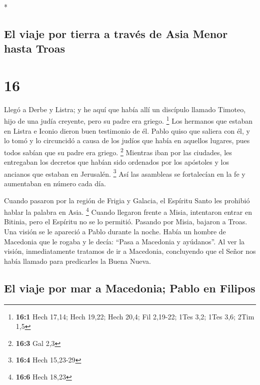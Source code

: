 \begin{paracol}{2}
\switchcolumn[0]*

\hypertarget{el-viaje-por-tierra-a-travuxe9s-de-asia-menor-hasta-troas}{%
\subsection{El viaje por tierra a través de Asia Menor hasta
Troas}\label{el-viaje-por-tierra-a-travuxe9s-de-asia-menor-hasta-troas}}

\hypertarget{section-30}{%
\section{16}\label{section-30}}

 Llegó a Derbe y Listra; y he aquí que había allí un
discípulo llamado Timoteo, hijo de una judía creyente, pero su padre era
griego. \footnote{\textbf{16:1} Hech 17,14; Hech 19,22; Hech 20,4; Fil
  2,19-22; 1Tes 3,2; 1Tes 3,6; 2Tim 1,5}  Los hermanos que
estaban en Listra e Iconio dieron buen testimonio de él. 
Pablo quiso que saliera con él, y lo tomó y lo circuncidó a causa de los
judíos que había en aquellos lugares, pues todos sabían que su padre era
griego. \footnote{\textbf{16:3} Gal 2,3}  Mientras iban
por las ciudades, les entregaban los decretos que habían sido ordenados
por los apóstoles y los ancianos que estaban en Jerusalén. \footnote{\textbf{16:4}
  Hech 15,23-29}  Así las asambleas se fortalecían en la
fe y aumentaban en número cada día.

 Cuando pasaron por la región de Frigia y Galacia, el
Espíritu Santo les prohibió hablar la palabra en Asia. \footnote{\textbf{16:6}
  Hech 18,23}  Cuando llegaron frente a Misia, intentaron
entrar en Bitinia, pero el Espíritu no se lo permitió. 
Pasando por Misia, bajaron a Troas.  Una visión se le
apareció a Pablo durante la noche. Había un hombre de Macedonia que le
rogaba y le decía: ``Pasa a Macedonia y ayúdanos''.  Al
ver la visión, inmediatamente tratamos de ir a Macedonia, concluyendo
que el Señor nos había llamado para predicarles la Buena Nueva.

\hypertarget{el-viaje-por-mar-a-macedonia-pablo-en-filipos}{%
\subsection{El viaje por mar a Macedonia; Pablo en
Filipos}\label{el-viaje-por-mar-a-macedonia-pablo-en-filipos}}


\end{paracol}
